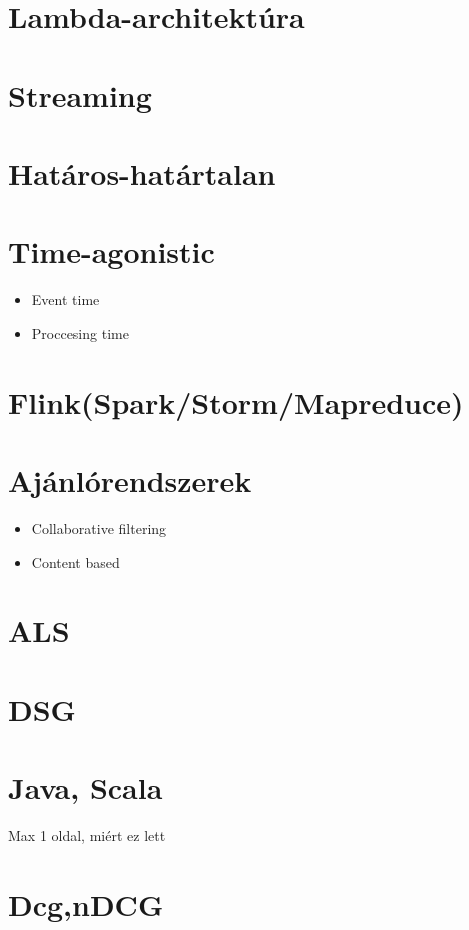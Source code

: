 \documentclass[a4paper,12pt]{article}
\begin{document}
\section{Lambda-architektúra}
\section{Streaming}
\section{Határos-határtalan}
\section{Time-agonistic}
\begin{itemize}
\item Event time
\item Proccesing time
\end{itemize}
\section{Flink(Spark/Storm/Mapreduce)}
\section{Ajánlórendszerek}
\begin{itemize}
\item Collaborative filtering
\item Content based
\end{itemize}
\section{ALS}
\section{DSG}
\section{Java, Scala}
Max 1 oldal, miért ez lett
\section{Dcg,nDCG}
\end{document}
